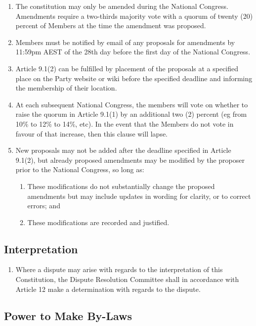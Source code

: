 \documentclass[a4paper,titlepage,8.5pt]{article}
\begin{document}
\begin{enumerate}
\item The constitution may only be amended during the National Congress. Amendments require a two-thirds majority vote with a quorum of twenty (20) percent of Members at the time the amendment was proposed.
\item Members must be notified by email of any proposals for amendments by 11:59pm AEST of the 28th day before the first day of the National Congress.
\item Article 9.1(2) can be fulfilled by placement of the proposals at a specified place on the Party website or wiki before the specified deadline and informing the membership of their location.
\item At each subsequent National Congress, the members will vote on whether to raise the quorum in Article 9.1(1) by an additional two (2) percent (eg from 10\% to 12\% to 14\%, etc). In the event that the Members do not vote in favour of that increase, then this clause will lapse.
\item New proposals may not be added after the deadline specified in Article 9.1(2), but already proposed amendments may be modified by the proposer prior to the National Congress, so long as:
\begin{enumerate}
  \item These modifications do not substantially change the proposed amendments but may include updates in wording for clarity, or to correct errors; and
  \item These modifications are recorded and justified.
\end{enumerate}

\end{enumerate}

\subsection{Interpretation}

\begin{enumerate}
\item Where a dispute may arise with regards to the interpretation of this Constitution, the Dispute Resolution Committee shall in accordance with Article 12 make a determination with regards to the dispute.
\end{enumerate}

\subsection{Power to Make By-Laws}
\end{document}
